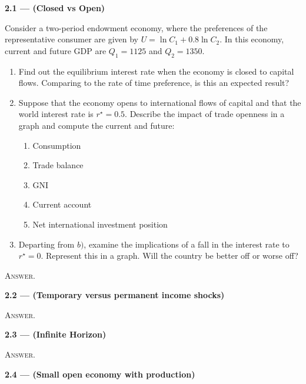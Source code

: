 \documentclass[11pt, a4paper]{article}
\begin{document}
\newpage

\textbf{2.1 — (Closed vs Open)}

Consider a two-period endowment economy, where the preferences of the representative consumer are given by $U=\ln{C_1} + 0.8\ln{C_2}$. In this economy, current and future GDP are $Q_1 = 1125$ and $Q_2 = 1350$.

\begin{enumerate}[label=\emph{\alph*}), topsep = \lineskip, itemsep = \lineskip, partopsep = \lineskip, parsep = \lineskip]
	\item Find out the equilibrium interest rate when the economy is closed to capital flows. Comparing to the rate of time preference, is this an expected result?
	\item Suppose that the economy opens to international flows of capital and that the world interest rate is $r^\star = 0.5$. Describe the impact of trade openness in a graph and compute the current and future:
	\begin{enumerate}[label=\roman*., topsep = \lineskip, itemsep = \lineskip, partopsep = \lineskip, parsep = \lineskip]
		\item Consumption
    \item Trade balance
    \item GNI
    \item Current account
    \item Net international investment position
	\end{enumerate}
	\item Departing from $\mathit{b)}$, examine the implications of a fall in the interest rate to $r^\star = 0$. Represent this in a graph. Will the country be better off or worse off?
\end{enumerate}

\dotfill

\textsc{Answer.}

\clearpage
\textbf{2.2 — (Temporary versus permanent income shocks)}

\dotfill

\textsc{Answer.}

\clearpage
\textbf{2.3 — (Infinite Horizon)}

\dotfill

\textsc{Answer.}

\clearpage
\textbf{2.4 — (Small open economy with production)}
\end{document}
